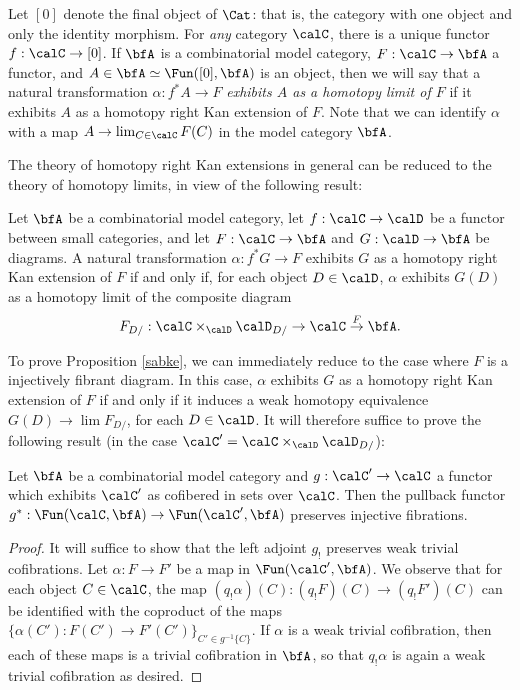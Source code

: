 \begin{Model Categories}
\begin{Didn't Read}
Let $[0]$ denote the final object of $\Cat$: that is, the category with one object and only the identity morphism. For {\em any} category $\calC$, there is a unique
functor $f: \calC \rightarrow [0]$. If $\bfA$ is a combinatorial
model category, $F: \calC \rightarrow \bfA$ a functor, and $A \in \bfA \simeq \Fun( [0], \bfA)$
is an object, then we will say that a natural transformation
$\alpha: f^{\ast} A \rightarrow F$ {\it exhibits $A$ as a homotopy limit of $F$} if it exhibits $A$
as a homotopy right Kan extension of $F$. Note that we can identify
$\alpha$ with a map $A \rightarrow \lim_{C \in \calC} F(C)$ in the model category $\bfA$.

The theory of homotopy right Kan extensions in general can be reduced to the theory
of homotopy limits, in view of the following result:

\begin{proposition}\label{sabke}
Let $\bfA$ be a combinatorial model category, let $f: \calC \rightarrow \calD$ be a functor
between small categories, and let $F: \calC \rightarrow \bfA$ and $G: \calD \rightarrow \bfA$
be diagrams. A natural transformation $\alpha: f^{\ast} G \rightarrow F$ exhibits
$G$ as a homotopy right Kan extension of $F$ if and only if, for each object
$D \in \calD$, $\alpha$ exhibits $G(D)$ as a homotopy limit of the composite diagram
$$ F_{D/}: \calC \times_{ \calD } \calD_{D/} \rightarrow \calC \stackrel{F}{\rightarrow} \bfA. $$
\end{proposition}

To prove Proposition \ref{sabke}, we can immediately reduce to the case where
$F$ is a injectively fibrant diagram. In this case, $\alpha$ exhibits $G$ as a homotopy
right Kan extension of $F$ if and only if it induces a weak homotopy equivalence
$G(D) \rightarrow \lim F_{D/}$, for each $D \in \calD$. It will therefore suffice to prove the following result
(in the case $\calC' = \calC \times_{\calD} \calD_{D/}$):

\begin{lemma}\label{sumtuous}
Let $\bfA$ be a combinatorial model category and $g: \calC' \rightarrow \calC$
a functor which exhibits $\calC'$ as cofibered in sets over $\calC$.
Then the pullback functor $g^{\ast}: \Fun(\calC, \bfA) \rightarrow \Fun( \calC', \bfA)$
preserves injective fibrations.
\end{lemma}

\begin{proof}
It will suffice to show that the left adjoint $g_{!}$ preserves weak trivial cofibrations. 
Let $\alpha: F \rightarrow F'$ be a map in $\Fun( \calC', \bfA)$.
We observe that for each object $C \in \calC$, the map 
$(q_{!} \alpha)(C): (q_{!} F)(C) \rightarrow (q_{!} F')(C)$ can be identified
with the coproduct of the maps $\{ \alpha(C'): F(C') \rightarrow F'(C') \}_{ C' \in g^{-1} \{C\} }$.
If $\alpha$ is a weak trivial cofibration, then each of these maps is a trivial cofibration in $\bfA$, so that
$q_{!} \alpha$ is again a weak trivial cofibration as desired.
\end{proof}


\end{Didn't Read}
\end{Model Categories}
